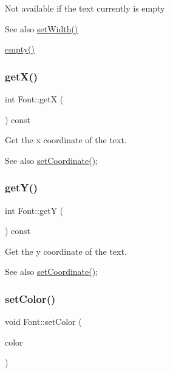 Not available if the text currently is empty \begin{DoxySeeAlso}{See also}
\mbox{\hyperlink{class_font_a97115438619656cb75d5b87636cec75e}{set\+Width()}} 

\mbox{\hyperlink{class_font_add8908307abd40c4855c265582dad897}{empty()}} 
\end{DoxySeeAlso}
\mbox{\label{class_font_a88e52dca0997ab9c21ac656d67259961}} 
\subsubsection{\texorpdfstring{get\+X()}{getX()}}
{\footnotesize\ttfamily int Font\+::getX (\begin{DoxyParamCaption}{ }\end{DoxyParamCaption}) const}



Get the x coordinate of the text. 

\begin{DoxySeeAlso}{See also}
\mbox{\hyperlink{class_font_a1c07aeed965112704d0872e9093c38a3}{set\+Coordinate()}}; 
\end{DoxySeeAlso}
\mbox{\label{class_font_a8701db15b5977fd99f8622505194a27d}} 
\subsubsection{\texorpdfstring{get\+Y()}{getY()}}
{\footnotesize\ttfamily int Font\+::getY (\begin{DoxyParamCaption}{ }\end{DoxyParamCaption}) const}



Get the y coordinate of the text. 

\begin{DoxySeeAlso}{See also}
\mbox{\hyperlink{class_font_a1c07aeed965112704d0872e9093c38a3}{set\+Coordinate()}}; 
\end{DoxySeeAlso}
\mbox{\label{class_font_af7bbc373536b3193fdee4c56e61f2463}} 
\subsubsection{\texorpdfstring{set\+Color()}{setColor()}}
{\footnotesize\ttfamily void Font\+::set\+Color (\begin{DoxyParamCaption}\item[{const \mbox{\hyperlink{class_r_g_b_color}{R\+G\+B\+Color}} \&}]{color }\end{DoxyParamCaption})}

